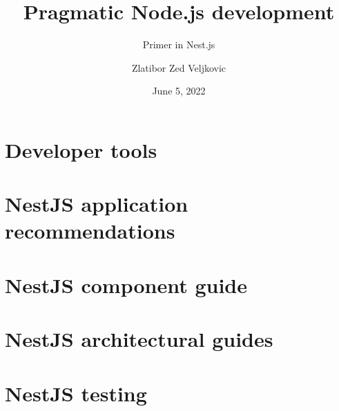 \documentclass[lang=en,color=green]{elegantbook}
\title{Pragmatic Node.js development}
\subtitle{Primer in Nest.js}
\author{Zlatibor Zed Veljkovic}
\date{June 5, 2022}
\begin{document}
    \maketitle
    \frontmatter

    \tableofcontents

    \mainmatter


    \chapter{Developer tools}\label{ch:developer-tools}
    

    \chapter{NestJS application recommendations}\label{ch:nestjs-application-recommendations}
    

    \chapter{NestJS component guide}\label{ch:nestjs-component-guides}
    

    \chapter{NestJS architectural guides}\label{ch:nestjs-architectural-guides}
    

    \chapter{NestJS testing}\label{ch:nestjs-testing}
    
\end{document}
